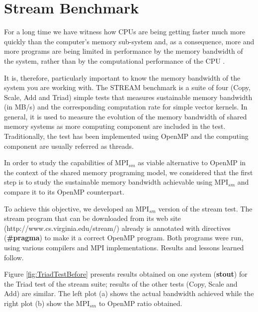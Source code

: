 \section{Stream Benchmark}

For a long time we have witness how CPUs are being getting faster much more quickly than the computer's memory sub-system and, as a consequence, more and more programs are being limited in performance by the memory bandwidth of the system, rather than by the computational performance of the CPU \cite{McCalpin2007}.

It is, therefore, particularly important to know the memory bandwidth of the system you are working with. The STREAM benchmark\cite{McCalpin2007} is a suite of four (Copy, Scale, Add and Triad) simple tests that measures sustainable memory bandwidth (in MB/s) and the corresponding computation rate for simple vector kernels. In general, it is used to measure the evolution of the memory bandwidth of shared memory systems as more computing component are included in the test. Traditionally, the test has been implemented using OpenMP and the computing component are usually referred as threads.

In order to study the capabilities of MPI$_{sm}$ as viable alternative to OpenMP in the context of the shared memory programing model, we considered that the first step is to study the sustainable memory bandwidth achievable using MPI$_{sm}$ and compare it to its OpenMP counterpart.


To achieve this objective, we developed an MPI$_{sm}$ version of the stream test. The stream program that can be downloaded from its web site (http://www.cs.virginia.edu/stream/) already is annotated with directives (\textbf{\#pragma}) to make it a correct OpenMP program. Both programs were run, using various compilers and MPI implementations. Results and lessons learned follow.


Figure \ref{fig:TriadTestBefore} presents results obtained on one system (\textbf{stout}) for the Triad test of the stream suite; results of the other tests (Copy, Scale and Add) are similar. The left plot (a) shows the actual bandwidth achieved while the right plot (b) show the MPI$_{sm}$ to OpenMP ratio obtained.


 

